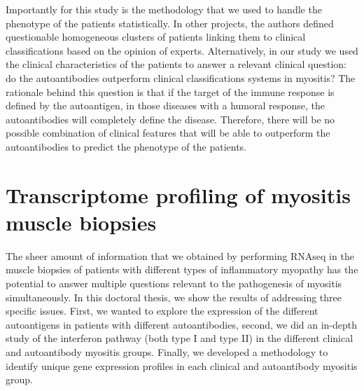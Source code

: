 Importantly for this study is the methodology that we used to handle the phenotype of the patients statistically. In other projects, the authors defined questionable homogeneous clusters of patients linking them to clinical classifications based on the opinion of experts.\cite{Mariampillai2018} Alternatively, in our study we used the clinical characteristics of the patients to answer a relevant clinical question: do the autoantibodies outperform clinical classifications systems in myositis? The rationale behind this question is that if the target of the immune response is defined by the autoantigen, in those diseases with a humoral response, the autoantibodies will completely define the disease. Therefore, there will be no possible combination of clinical features that will be able to outperform the autoantibodies to predict the phenotype of the patients.

\begin{table}
\caption{Proposal of myositis classification based on myositis-specific autoantibodies}
\label{tab:criteria}
\end{table}

\section{Transcriptome profiling of myositis muscle biopsies}

The sheer amount of information that we obtained by performing RNAseq in the muscle biopsies of patients with different types of inflammatory myopathy has the potential to answer multiple questions relevant to the pathogenesis of myositis simultaneously. In this doctoral thesis, we show the results of addressing three specific issues. First, we wanted to explore the expression of the different autoantigens in patients with different autoantibodies, second, we did an in-depth study of the interferon pathway (both type I and type II) in the different clinical and autoantibody myositis groups. Finally, we developed a methodology to identify unique gene expression profiles in each clinical and autoantibody myositis group.

